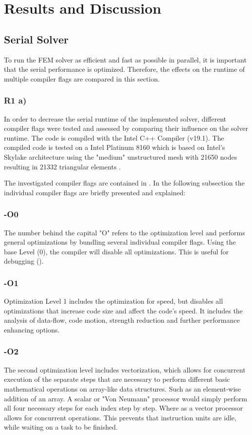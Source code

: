 \section{Results and Discussion}

\subsection{Serial Solver \label{sec:Serial}}

To run the FEM solver as efficient and fast as possible in parallel, it is important that the serial performance is optimized. Therefore, the effects on the runtime of multiple compiler flags are compared in this section.

\subsubsection{R1 a)}
In order to decrease the serial runtime of the implemented solver, different compiler flags were tested and assessed by comparing their influence on the solver runtime. The code is compiled with the Intel C++ Compiler (v19.1). The compiled code is tested on a Intel Platinum 8160 which is based on Intel's Skylake architecture using the "medium" unstructured mesh with 21650 nodes resulting in 21332 triangular elements .

The investigated compiler flags are contained in .
In the following subsection the individual compiler flags are briefly presented and explained: 

\subsubsection*{-O0}
The number behind the capital "O" refers to the optimization level and performs general optimizations by bundling several individual compiler flags. Using the base Level (0),  the compiler will disable all optimizations. This is useful for debugging ().

\subsubsection*{-O1}
Optimization Level 1 includes the optimization for speed, but disables all optimizations that increase code size and affect the code's speed. It includes the analysis of data-flow, code motion, strength reduction and further performance enhancing options.

\subsubsection*{-O2}
The second optimization level includes vectorization, which allows for concurrent execution of the separate steps that are necessary to perform different basic mathematical operations on array-like data structures. Such as an element-wise addition of an array. A scalar or "Von Neumann" processor would simply perform all four necessary steps for each index step by step. Where as a vector processor allows for concurrent operations. This prevents that instruction units are idle, while waiting on a task to be finished.

